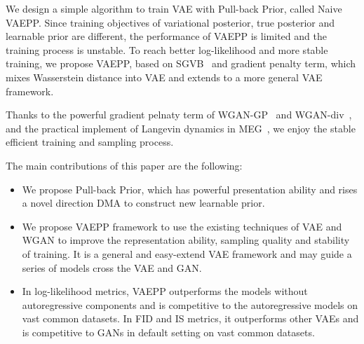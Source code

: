 We design a simple algorithm to train VAE with Pull-back Prior, called Naive VAEPP. Since training objectives of variational posterior, true posterior and learnable prior are different, the performance of VAEPP is limited and the training process is unstable. To reach better log-likelihood and more stable training, we propose VAEPP, based on SGVB~\cite{kingma2014auto} and gradient penalty term, which mixes Wasserstein distance into VAE and extends to a more general VAE framework. 

Thanks to the powerful gradient pelnaty term of WGAN-GP~\cite{gulrajani2017improved} and WGAN-div~\cite{wu2018wasserstein}, and the practical implement of Langevin dynamics in MEG~\cite{kumar2019maximum}, we enjoy the stable efficient training and sampling process. 

The main contributions of this paper are the following:
\begin{itemize}
	\item We propose Pull-back Prior, which has powerful presentation ability and rises a novel direction DMA to construct new learnable prior. 
	\item We propose VAEPP framework to use the existing techniques of VAE and WGAN to improve the representation ability, sampling quality and stability of training. It is a general and easy-extend VAE framework and may guide a series of models cross the VAE and GAN. 
	\item In log-likelihood metrics, VAEPP outperforms the models without autoregressive components and is competitive to the autoregressive models on vast common datasets. In FID and IS metrics, it outperforms other VAEs and is competitive to GANs in default setting on vast common datasets. 
\end{itemize}
